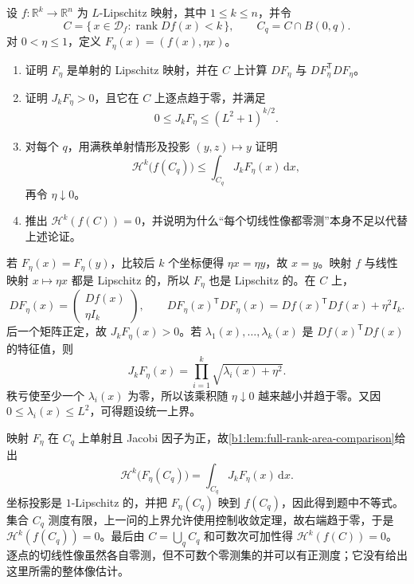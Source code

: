 \begin{exercise}[秩亏部分的增广映射]\label{b1:ex:17-rank-deficient-augmentation}
设 \(f:\mathbb R^k\to\mathbb R^n\) 为 \(L\)-Lipschitz 映射，其中 \(1\leq k\leq n\)，并令
\[
 C=\{\,x\in\mathcal D_f:\operatorname{rank}Df(x)<k\,\},
 \qquad C_q=C\cap B(0,q).
\]
对 \(0<\eta\leq1\)，定义 \(F_\eta(x)=(f(x),\eta x)\)。
\begin{enumerate}
\item 证明 \(F_\eta\) 是单射的 Lipschitz 映射，并在 \(C\) 上计算 \(DF_\eta\) 与 \(DF_\eta^{\mathsf T}DF_\eta\)。
\item 证明 \(J_kF_\eta>0\)，且它在 \(C\) 上逐点趋于零，并满足
\[
 0\leq J_kF_\eta\leq(L^2+1)^{k/2}.
\]
\item 对每个 \(q\)，用满秩单射情形及投影 \((y,z)\mapsto y\) 证明
\[
 \mathcal H^k\bigl(f(C_q)\bigr)
 \leq\int_{C_q}J_kF_\eta(x)\,\mathrm dx,
\]
再令 \(\eta\downarrow0\)。
\item 推出 \(\mathcal H^k(f(C))=0\)，并说明为什么“每个切线性像都零测”本身不足以代替上述论证。
\end{enumerate}
\end{exercise}
\begin{solution}
若 \(F_\eta(x)=F_\eta(y)\)，比较后 \(k\) 个坐标便得 \(\eta x=\eta y\)，故 \(x=y\)。映射 \(f\) 与线性映射 \(x\mapsto\eta x\) 都是 Lipschitz 的，所以 \(F_\eta\) 也是 Lipschitz 的。在 \(C\) 上，
\[
 DF_\eta(x)=
 \begin{pmatrix}Df(x)\\ \eta I_k\end{pmatrix},
 \qquad
 DF_\eta(x)^{\mathsf T}DF_\eta(x)
 =Df(x)^{\mathsf T}Df(x)+\eta^2I_k.
\]
后一个矩阵正定，故 \(J_kF_\eta(x)>0\)。若 \(\lambda_1(x),\ldots,\lambda_k(x)\) 是 \(Df(x)^{\mathsf T}Df(x)\) 的特征值，则
\[
 J_kF_\eta(x)=
 \prod_{i=1}^k\sqrt{\lambda_i(x)+\eta^2}.
\]
秩亏使至少一个 \(\lambda_i(x)\) 为零，所以该乘积随 \(\eta\downarrow0\) 越来越小并趋于零。又因 \(0\leq\lambda_i(x)\leq L^2\)，可得题设统一上界。

映射 \(F_\eta\) 在 \(C_q\) 上单射且 Jacobi 因子为正，故\cref{b1:lem:full-rank-area-comparison}给出
\[
 \mathcal H^k\bigl(F_\eta(C_q)\bigr)
 =\int_{C_q}J_kF_\eta(x)\,\mathrm dx.
\]
坐标投影是 \(1\)-Lipschitz 的，并把 \(F_\eta(C_q)\) 映到 \(f(C_q)\)，因此得到题中不等式。集合 \(C_q\) 测度有限，上一问的上界允许使用控制收敛定理，故右端趋于零，于是 \(\mathcal H^k(f(C_q))=0\)。最后由 \(C=\bigcup_qC_q\) 和可数次可加性得 \(\mathcal H^k(f(C))=0\)。逐点的切线性像虽然各自零测，但不可数个零测集的并可以有正测度；它没有给出这里所需的整体像估计。
\end{solution}

